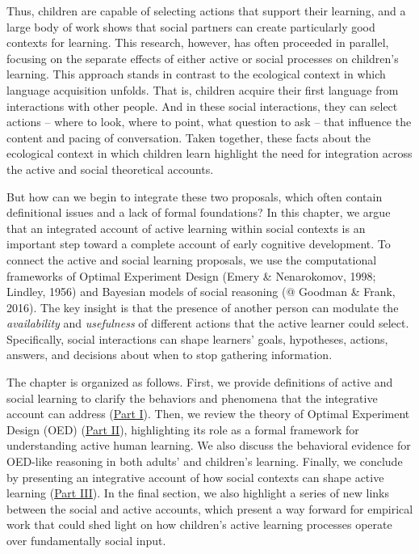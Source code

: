 \documentclass[oneside]{report}
\begin{document}
Thus, children are capable of selecting actions that support their
learning, and a large body of work shows that social partners can create
particularly good contexts for learning. This research, however, has
often proceeded in parallel, focusing on the separate effects of either
active or social processes on children's learning. This approach stands
in contrast to the ecological context in which language acquisition
unfolds. That is, children acquire their first language from
interactions with other people. And in these social interactions, they
can select actions -- where to look, where to point, what question to
ask -- that influence the content and pacing of conversation. Taken
together, these facts about the ecological context in which children
learn highlight the need for integration across the active and social
theoretical accounts.

But how can we begin to integrate these two proposals, which often
contain definitional issues and a lack of formal foundations? In this
chapter, we argue that an integrated account of active learning within
social contexts is an important step toward a complete account of early
cognitive development. To connect the active and social learning
proposals, we use the computational frameworks of Optimal Experiment
Design (Emery \& Nenarokomov, 1998; Lindley, 1956) and Bayesian models
of social reasoning (@ Goodman \& Frank, 2016). The key insight is that
the presence of another person can modulate the \emph{availability} and
\emph{usefulness} of different actions that the active learner could
select. Specifically, social interactions can shape learners' goals,
hypotheses, actions, answers, and decisions about when to stop gathering
information.

The chapter is organized as follows. First, we provide definitions of
active and social learning to clarify the behaviors and phenomena that
the integrative account can address (\protect\hyperlink{scope}{Part I}).
Then, we review the theory of Optimal Experiment Design (OED)
(\protect\hyperlink{oed}{Part II}), highlighting its role as a formal
framework for understanding active human learning. We also discuss the
behavioral evidence for OED-like reasoning in both adults' and
children's learning. Finally, we conclude by presenting an integrative
account of how social contexts can shape active learning
(\protect\hyperlink{active_social}{Part III}). In the final section, we
also highlight a series of new links between the social and active
accounts, which present a way forward for empirical work that could shed
light on how children's active learning processes operate over
fundamentally social input.
\end{document}
